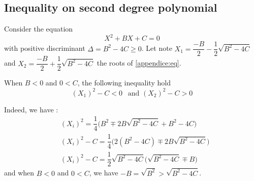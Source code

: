 \documentclass{article}
\begin{document}
\begin{appendices}
\section{Inequality on second degree polynomial \label{appendice:ineq2nd}}

Consider the equation
\begin{equation}
X^2 + B X + C = 0
\label{appendice:eq}
\end{equation}
with positive discriminant $\Delta = B^2 - 4C \geq 0$. Let note $X_{1} = \dfrac{-B}{2} - \dfrac{1}{2} \sqrt{B^2 - 4 C}$ and $X_2 = \dfrac{-B}{2} + \dfrac{1}{2} \sqrt{B^2 - 4 C}$  the roots of \eqref{appendice:eq}.

When $B < 0$ and $0 < C$, the following inequality hold
\begin{equation}
(X_1) ^ 2 - C < 0 \:\:\text{ and } (X_2)^2 - C > 0
\end{equation}

Indeed, we have :
\begin{subequations}
\begin{align}
&(X_i) ^2 = \dfrac{1}{4} \Big(B^2 \mp 2 B\sqrt{B^2 - 4C} + B^2 - 4C \Big) \\
&(X_i)^2 - C = \dfrac{1}{4} \Big(2(B^2 - 4C) \mp 2B \sqrt{B^2 - 4C} \Big) \\
&(X_i)^2 - C = \dfrac{1}{2} \sqrt{B^2 - 4C} \Big( \sqrt{B^2 - 4C} \mp B \Big)
\end{align}
\end{subequations}
and when $B < 0$ and $0 < C$, we have $ -B = \sqrt{B^2} > \sqrt{B^2 - 4C}$.




\end{appendices}



\end{document}
